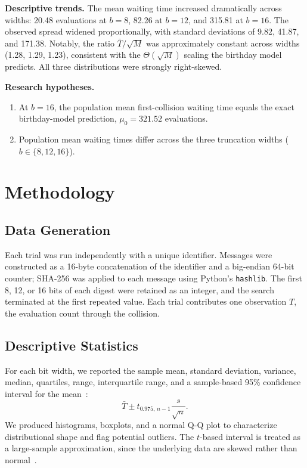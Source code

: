 \documentclass[12pt,letterpaper]{article}
\begin{document}
\textbf{Descriptive trends.} The mean waiting time increased dramatically across widths: 20.48 evaluations at $b=8$, 82.26 at $b=12$, and 315.81 at $b=16$. The observed spread widened proportionally, with standard deviations of 9.82, 41.87, and 171.38. Notably, the ratio $\bar{T}/\sqrt{M}$ was approximately constant across widths (1.28, 1.29, 1.23), consistent with the $\Theta(\sqrt{M})$ scaling the birthday model predicts. All three distributions were strongly right-skewed.

\textbf{Research hypotheses.}
\begin{enumerate}
    \item[(H\textsubscript{1})] At $b=16$, the population mean first-collision waiting time equals the exact birthday-model prediction, $\mu_0 = 321.52$ evaluations.
    \item[(H\textsubscript{2})] Population mean waiting times differ across the three truncation widths ($b \in \{8, 12, 16\}$).
\end{enumerate}

\section{Methodology}

\subsection{Data Generation}
Each trial was run independently with a unique identifier. Messages were constructed as a 16-byte concatenation of the identifier and a big-endian 64-bit counter; SHA-256 was applied to each message using Python's \texttt{hashlib}. The first 8, 12, or 16 bits of each digest were retained as an integer, and the search terminated at the first repeated value. Each trial contributes one observation $T$, the evaluation count through the collision.

\subsection{Descriptive Statistics}
For each bit width, we reported the sample mean, standard deviation, variance, median, quartiles, range, interquartile range, and a sample-based 95\% confidence interval for the mean~\cite{nistMeanCI}:
\[
\bar{T} \pm t_{0.975,\,n-1} \frac{s}{\sqrt{n}}.
\]
We produced histograms, boxplots, and a normal Q-Q plot to characterize distributional shape and flag potential outliers. The $t$-based interval is treated as a large-sample approximation, since the underlying data are skewed rather than normal~\cite{nistMeanCI}.
\end{document}
